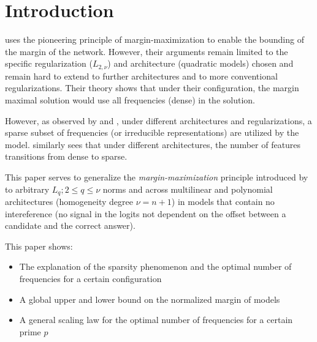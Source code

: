 \section{Introduction}\label{sec:intro}

\citet{morwani2024feature} uses the pioneering principle of margin-maximization to enable the bounding of the margin of the network. However, their arguments remain limited to the specific regularization ($L_{2, \nu}$) and architecture (quadratic models) chosen and remain hard to extend to further architectures and to more conventional regularizations. Their theory shows that under their configuration, the margin maximal solution would use all frequencies (dense) in the solution. 

However, as observed by \citet{nanda2023progress} and \citet{chughtai2023toy}, under different architectures and regularizations, a sparse subset of frequencies (or irreducible representations) are utilized by the model. \citet{mccracken2025} similarly sees that under different architectures, the number of features transitions from dense to sparse.

This paper serves to generalize the \emph{margin-maximization} principle introduced by \citet{morwani2024feature} to arbitrary $L_{q}; 2\le q \le \nu$ norms and across multilinear and polynomial architectures (homogeneity degree $\nu=n+1$) in models that contain no intereference (no signal in the logits not dependent on the offset between a candidate and the correct answer). 

This paper shows:
\begin{itemize}[label={}]
  \item The explanation of the sparsity phenomenon and the optimal number of frequencies for a certain configuration
  \item A global upper and lower bound on the normalized margin of models
  \item A general scaling law for the optimal number of frequencies for a certain prime $p$
\end{itemize}
